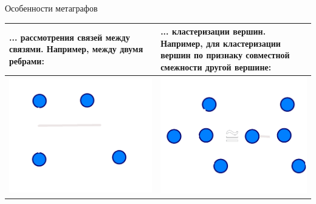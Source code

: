 \documentclass{beamer}
\begin{document}
\begin{darkframes}
\begin{frame}[label=lists]{Особенности метаграфов}
			\begin{tabular}{|p{0.48\textwidth}|p{}|} \hline
					... рассмотрения \alert{связей между связями}. Например, между двумя ребрами:
						&
					... кластеризации вершин. Например, для \alert{кластеризации} вершин по признаку совместной смежности другой вершине: \\
					\hline
					\centering 
					\includegraphics[scale=0.1]{resources/rtr} & \includegraphics[scale=0.1]{resources/rtc} \\ \hline
			\end{tabular}
	\end{frame}


\end{darkframes}
\end{document}
